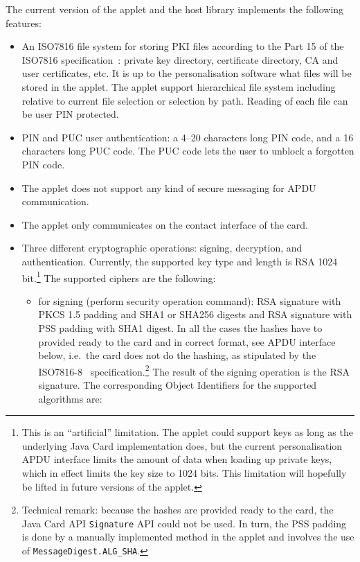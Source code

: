 \documentclass{article}
\begin{document}
The current version of the applet and the host library implements the
following features:
\begin{itemize}
\item An ISO7816 file system for storing PKI files according to the
  Part 15 of the ISO7816 specification~\cite{ISO15}: private key
  directory, certificate directory, CA and user certificates, etc.  It
  is up to the personalisation software what files will be stored in
  the applet.  The applet support hierarchical file system including
  relative to current file selection or selection by path. Reading of
  each file can be user PIN protected.
\item PIN and PUC user authentication: a 4--20 characters long PIN
  code, and a 16 characters long PUC code. The PUC code lets the user
  to unblock a forgotten PIN code.
\item The applet does not support any kind of secure messaging for
  APDU communication.
\item The applet only communicates on the contact interface of the
  card.
\item Three different cryptographic operations: signing, decryption,
  and authentication.  Currently, the supported key type and length is
  RSA 1024 bit.\footnote{This is an ``artificial'' limitation.  The
    applet could support keys as long as the underlying Java Card
    implementation does, but the current personalisation APDU
    interface limits the amount of data when loading up private keys,
    which in effect limits the key size to 1024 bits. This limitation
    will hopefully be lifted in future versions of the applet.} The
  supported ciphers are the following:
\begin{itemize}
\item for signing (perform security operation command): RSA signature
  with PKCS 1.5 padding and SHA1 or SHA256 digests and RSA signature
  with PSS padding with SHA1 digest.  In all the cases the hashes have
  to provided ready to the card and in correct format, see APDU
  interface below, i.e.\ the card does not do the hashing, as
  stipulated by the ISO7816-8~\cite{ISO8} specification.\footnote{%
    Technical remark: because the hashes are provided ready to the
    card, the Java Card API \texttt{Signature} API could not be
    used. In turn, the PSS padding is done by a manually implemented
    method in the applet and involves the use of
    \texttt{MessageDigest.ALG\_SHA}.} The result of the signing
  operation is the RSA signature.  The corresponding Object
  Identifiers for the supported algorithms are:

\end{itemize}
\end{itemize}
\end{document}
